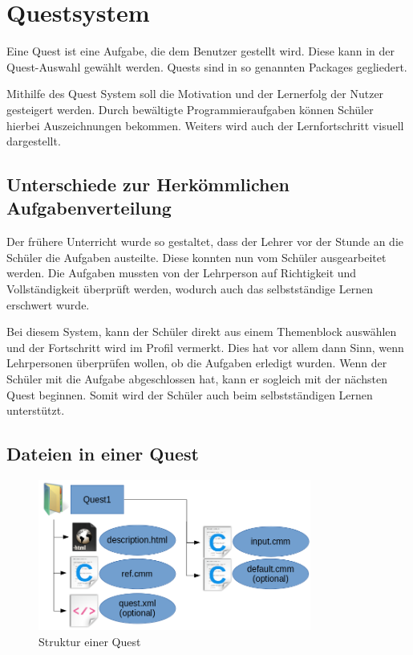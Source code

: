 \chapter{Questsystem}
Eine Quest ist eine Aufgabe, die dem Benutzer gestellt wird. Diese kann in der Quest-Auswahl gewählt werden. Quests sind in so genannten Packages gegliedert. 

Mithilfe des Quest System soll die Motivation und der Lernerfolg der Nutzer gesteigert werden. Durch bewältigte Programmieraufgaben können Schüler hierbei Auszeichnungen bekommen. Weiters wird auch der Lernfortschritt visuell dargestellt.

\section{Unterschiede zur Herkömmlichen Aufgabenverteilung}
Der frühere Unterricht wurde so gestaltet, dass der Lehrer vor der Stunde an die Schüler die Aufgaben austeilte. Diese konnten nun vom Schüler ausgearbeitet werden. Die Aufgaben mussten von der Lehrperson auf Richtigkeit und Vollständigkeit überprüft werden, wodurch auch das selbstständige Lernen erschwert wurde.

Bei diesem System, kann der Schüler direkt aus einem Themenblock auswählen und der Fortschritt wird im Profil vermerkt. Dies hat vor allem dann Sinn, wenn Lehrpersonen überprüfen wollen, ob die Aufgaben erledigt wurden. Wenn der Schüler mit die Aufgabe abgeschlossen hat, kann er sogleich mit der nächsten Quest beginnen. Somit wird der Schüler auch beim selbstständigen Lernen unterstützt.

\section{Dateien in einer Quest}
\begin{figure}[h] 
  \centering
     \includegraphics[width=0.8\textwidth]{./media/images/quest/quest_ordnerstruktur}
  \caption{Struktur einer Quest}
  \label{fig:struct_quest}
\end{figure}

